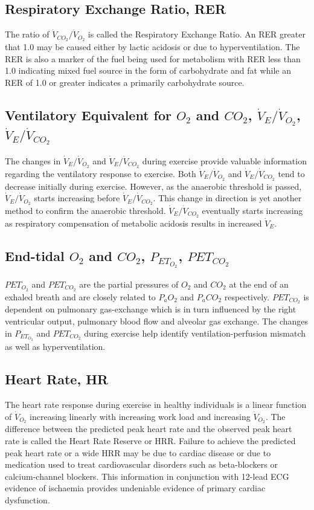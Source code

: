 \subsection{Respiratory Exchange Ratio, RER}
The ratio of $\dot{V}_{CO_2}/\dot{V}_{O_2}$ is called the Respiratory Exchange Ratio. 
An RER greater that 1.0 may be caused either by lactic acidosis or due to hyperventilation. 
The RER is also a marker of the fuel being used for metabolism with RER less than 1.0 indicating mixed fuel source in the form of carbohydrate and fat while an RER of 1.0 or greater indicates a primarily carbohydrate source.

\subsection{Ventilatory Equivalent for $O_2$ and $CO_2$, $\dot{V}_E/\dot{V}_{O_2}$, $\dot{V}_E/\dot{V}_{CO_2}$}
The changes in $\dot{V}_E/\dot{V}_{O_2}$ and $\dot{V}_E/\dot{V}_{CO_2}$ during exercise provide valuable information regarding the ventilatory response to exercise. 
Both $\dot{V}_E/\dot{V}_{O_2}$ and $\dot{V}_E/\dot{V}_{CO_2}$ tend to decrease initially during exercise. 
However, as the anaerobic threshold is passed, $\dot{V}_E/\dot{V}_{O_2}$ starts increasing before $\dot{V}_E/\dot{V}_{CO_2}$. 
This change in direction is yet another method to confirm the anaerobic threshold. $\dot{V}_E/\dot{V}_{CO_2}$ eventually starts increasing as respiratory compensation of metabolic acidosis results in increased $\dot{V}_E$.

\subsection{End-tidal $O_2$ and $CO_2$, $P_{ET_{O_2}}$, $P{ET_{CO_2}}$}
$PET_{O_2}$ and $PET_{CO_2}$ are the partial pressures of $O_2$ and $CO_2$ at the end of an exhaled breath and are closely related to $P_aO_2$ and $P_aCO_2$ respectively. $P{ET_{CO_2}}$ is dependent on pulmonary gas-exchange which is in turn influenced by the right ventricular output, pulmonary blood flow and alveolar gas exchange. 
The changes in $P_{ET_{O_2}}$ and $P{ET_{CO_2}}$ during exercise help identify ventilation-perfusion mismatch as well as hyperventilation.

\subsection{Heart Rate, HR}
\label{sec:heart_rate}
The heart rate response during exercise in healthy individuals is a linear function of $\dot{V}_{O_2}$ increasing linearly with increasing work load and increasing $\dot{V}_{O_2}$. 
The difference between the predicted peak heart rate and the observed peak heart rate is called the Heart Rate Reserve or HRR. 
Failure to achieve the predicted peak heart rate or a wide HRR may be due to cardiac disease or due to medication used to treat cardiovascular disorders such as beta-blockers or calcium-channel blockers. 
This information in conjunction with 12-lead ECG evidence of ischaemia provides undeniable evidence of primary cardiac dysfunction.

